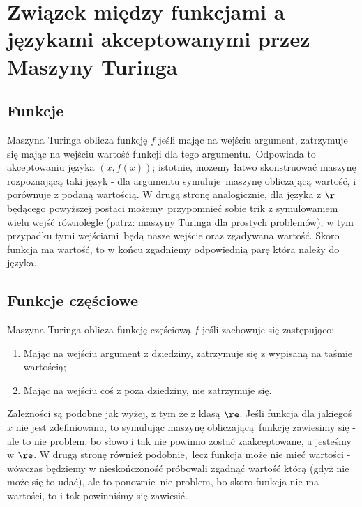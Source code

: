 \section{Związek między funkcjami a językami akceptowanymi przez Maszyny Turinga}

\subsection{Funkcje}

Maszyna Turinga oblicza funkcję \(f\) jeśli mając na wejściu argument, zatrzymuje się mając na wejściu wartość funkcji dla tego argumentu.\
Odpowiada to akceptowaniu języka \((x, f(x))\); istotnie, możemy łatwo skonstruować maszynę rozpoznającą taki język - dla argumentu symuluje\
maszynę obliczającą wartość, i porównuje z podaną wartością. W drugą stronę analogicznie, dla języka z \(\r\) będącego powyższej postaci możemy\
przypomnieć sobie trik z symulowaniem wielu wejść równolegle (patrz: maszyny Turinga dla prostych problemów); w tym przypadku tymi wejściami\
będą nasze wejście oraz zgadywana wartość. Skoro funkcja ma wartość, to w końcu zgadniemy odpowiednią parę która należy do języka.

\subsection{Funkcje częściowe}

Maszyna Turinga oblicza funkcję częściową \(f\) jeśli zachowuje się zastępująco:

\begin{enumerate}
    \item Mając na wejściu argument z dziedziny, zatrzymuje się z wypisaną na taśmie wartością;
    \item Mając na wejściu coś z poza dziedziny, nie zatrzymuje się.
\end{enumerate}

Zależności są podobne jak wyżej, z tym że z klasą \(\re\). Jeśli funkcja dla jakiegoś \(x\) nie jest zdefiniowana, to symulując maszynę obliczającą\
funkcję zawiesimy się - ale to nie problem, bo słowo i tak nie powinno zostać zaakceptowane, a jesteśmy w \(\re\). W drugą stronę również podobnie,\
lecz funkcja może nie mieć wartości - wówczas będziemy w nieskończoność próbowali zgadnąć wartość którą (gdyż nie może się to udać), ale to ponownie\
nie problem, bo skoro funkcja nie ma wartości, to i tak powinniśmy się zawiesić.